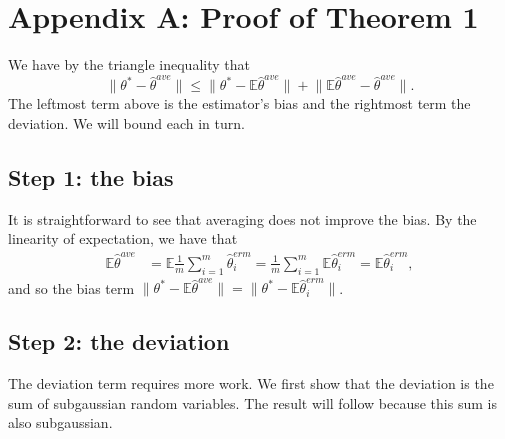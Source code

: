 \documentclass[twoside]{article}
\newcommand{\E}{\mathbb{E}}
\newcommand{\w}{\theta}
\newcommand{\wave}{\hat\w^{ave}}
\newcommand{\wmle}{\hat\w^{erm}}
\newcommand{\wstar}{{\w^{*}}}
\newcommand{\ltwo}[1]{{\lVert {#1} \rVert}}
\begin{document}


\clearpage




\clearpage

\section*{Appendix A: Proof of Theorem 1}
We have by the triangle inequality that
\begin{equation}
\ltwo{\wstar-\wave} \le \ltwo{\wstar-\E\wave} + \ltwo{\E\wave-\wave}
.
\label{eq:biasvar}
\end{equation}
The leftmost term above is the estimator's bias and the rightmost term the deviation.
We will bound each in turn.

\subsection*{Step 1: the bias}
It is straightforward to see that averaging does not improve the bias.
By the linearity of expectation, we have that
\begin{align}
\E\wave
&=
\E\frac{1}{m}\sum_{i=1}^m\wmle_i
=
\frac{1}{m}\sum_{i=1}^m\E\wmle_i
=
\E\wmle_i
,
\label{eq:expwave}
\end{align}
and so the bias term
$\ltwo{\wstar-\E\wave}
=
\ltwo{\wstar-\E\wmle_i}
$.

\subsection*{Step 2: the deviation}
The deviation term requires more work.
We first show that the deviation is the sum of subgaussian random variables.
The result will follow because this sum is also subgaussian.
\end{document}
